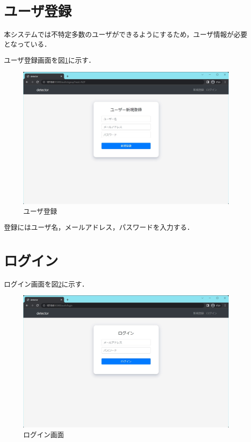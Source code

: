 \documentclass[a4j,12pt,dvipdfmx]{jreport}
\begin{document}
\section{ユーザ登録}
本システムでは不特定多数のユーザができるようにするため，ユーザ情報が必要となっている．

ユーザ登録画面を図\ref{fig:user_register}に示す．

\begin{figure}[b]
  \centering
  \includegraphics[width=13cm]{image/user_register.jpg}
  \caption{ユーザ登録}
  \label{fig:user_register}
\end{figure}

登録にはユーザ名，メールアドレス，パスワードを入力する．

\section{ログイン}
ログイン画面を図\ref{fig:user_login}に示す．

\begin{figure}[b]
  \centering
  \includegraphics[width=13cm]{image/user_login.jpg}
  \caption{ログイン画面}
  \label{fig:user_login}
\end{figure}
\end{document}
